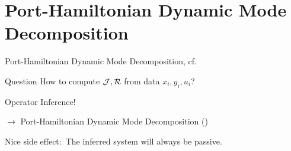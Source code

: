\section{Port-Hamiltonian Dynamic Mode Decomposition}

\begin{frame}{Port-Hamiltonian Dynamic Mode Decomposition, cf.~\cite{Morandin2022}}
    \begin{alertblock}{Question}
        How to compute $\mathcal{J}, \mathcal{R}$ from data $x_i, y_i, u_i$?
    \end{alertblock}

    Operator Inference!

    $\rightarrow$ Port-Hamiltonian Dynamic Mode Decomposition (\cite{Morandin2022})

    Nice side effect:\ The inferred system will always be passive.
\end{frame}

